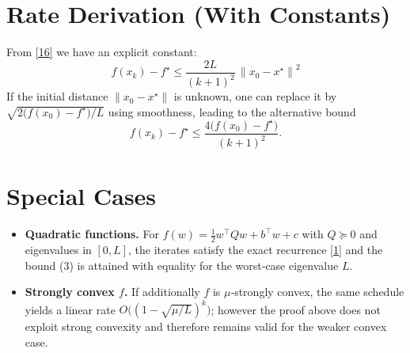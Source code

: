 \documentclass{article}
\newcommand{\norm}[1]{\left\|#1\right\|}
\begin{document}
\section*{Rate Derivation (With Constants)}
From \eqref{16} we have an explicit constant:
\[
\boxed{ \displaystyle
f(x_k)-f^{\star}\le \frac{2L}{(k+1)^{2}}\,
\norm{x_0-x^{\star}}^{2}
}
\]
If the initial distance $\norm{x_0-x^{\star}}$ is unknown, one can replace it by $\sqrt{2\bigl(f(x_0)-f^{\star}\bigr)/L}$ using smoothness, leading to the alternative bound
\[
f(x_k)-f^{\star}\le \frac{4\bigl(f(x_0)-f^{\star}\bigr)}{(k+1)^{2}} .
\]

\section*{Special Cases}
\begin{itemize}
\item \textbf{Quadratic functions.} For $f(w)=\frac12 w^{\top}Qw+b^{\top}w+c$ with $Q\succeq 0$ and eigenvalues in $[0,L]$, the iterates satisfy the exact recurrence \eqref{1} and the bound (3) is attained with equality for the worst‑case eigenvalue $L$.
\item \textbf{Strongly convex $f$.} If additionally $f$ is $\mu$‑strongly convex, the same schedule yields a linear rate $O\bigl((1-\sqrt{\mu/L})^{k}\bigr)$; however the proof above does not exploit strong convexity and therefore remains valid for the weaker convex case.
\end{itemize}
\end{document}
